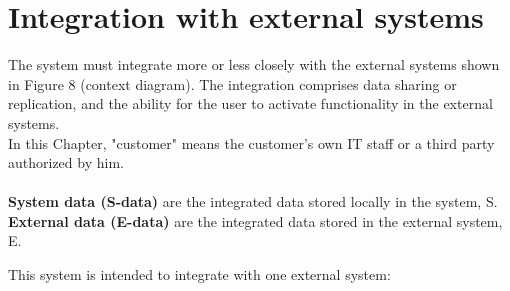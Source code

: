 \documentclass[Main]{subfiles}
\begin{document}
\chapter{Integration with external systems}\label{cha:F}

The system must integrate more or less closely with the external systems shown in Figure 8 (context diagram). The integration comprises data sharing or replication, and the ability for the user to activate functionality in the external systems. 
\\
In this Chapter, "customer" means the customer's own IT staff or a third party authorized by him.
\\
\\
\textbf{System data (S-data)} are the integrated data stored locally in the system, S.\\
\textbf{External data (E-data)} are the integrated data stored in the external system, E.

This system is intended to integrate with one external system:






\end{document}
